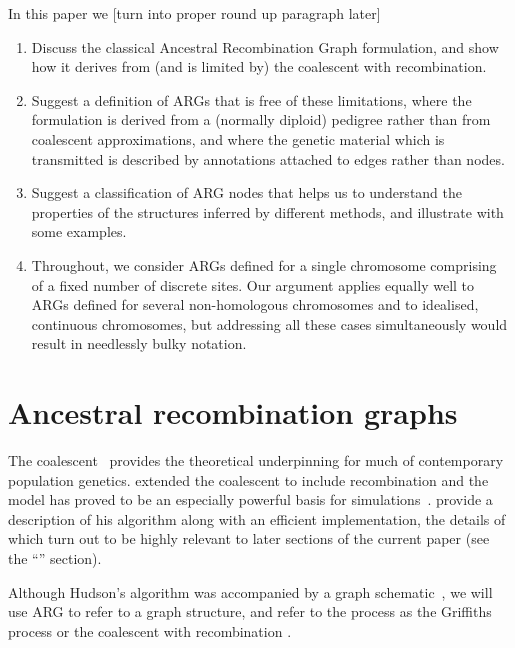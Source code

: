\documentclass{article}
\begin{document}
In this paper we [turn into proper round up paragraph later]
\begin{enumerate}
\item Discuss the classical Ancestral Recombination Graph formulation,
and show how it derives from (and is limited by) the coalescent with
recombination.
\item Suggest a definition of ARGs that is free of these limitations,
where the formulation is derived from a (normally diploid) pedigree rather than from
coalescent approximations, and where the genetic
material which is transmitted is described by annotations attached to
edges rather than nodes.
\item Suggest a classification of ARG nodes that helps us to understand
the properties of the structures inferred by different methods, and illustrate
with some examples.
\item Throughout, we consider ARGs defined for a single chromosome comprising
of a fixed number of discrete sites. Our argument applies equally well to ARGs
defined for several non-homologous chromosomes \citep{fearnhead2003ancestral,
koskela2019robust} and to idealised, continuous chromosomes, but addressing
all these cases simultaneously would result in needlessly bulky notation.
\end{enumerate}

\section*{Ancestral recombination graphs}

The coalescent~\citep{kingman1982coalescent,kingman1982genealogy,
hudson1983testing, tajima1983evolutionary}
provides the theoretical underpinning for much of contemporary population genetics.
\citet{hudson1983properties,hudson1990gene} extended the coalescent to include
recombination
and the model has proved to be an especially powerful basis for
simulations~\citep{hudson2002generating,baumdicker2021efficient}.
\cite{kelleher2016efficient} provide a description of his algorithm along with
an efficient implementation, the details of which turn out to be highly relevant to
later sections of the current paper (see the ``'' section).

Although Hudson's algorithm was accompanied by a graph
schematic~\citep[][Fig. 5]{hudson1983properties}, %
we will use ARG to refer to a graph structure, and refer to the
process as the Griffiths process or the coalescent with recombination
\citep{minichiello2006mapping}.
\end{document}
